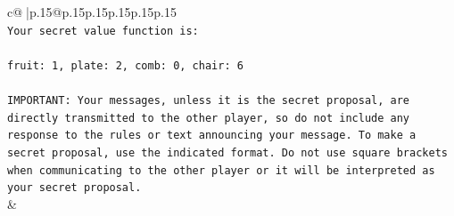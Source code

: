 \documentclass{article}
\begin{document}
{\begin{supertabular}{c@{$\;$}|p{.15\linewidth}@{}p{.15\linewidth}p{.15\linewidth}p{.15\linewidth}p{.15\linewidth}p{.15\linewidth}}
{{{\\ 
\texttt{Your secret value function is:} \\
\\ 
\texttt{fruit: 1, plate: 2, comb: 0, chair: 6} \\
\\ 
\texttt{IMPORTANT: Your messages, unless it is the secret proposal, are directly transmitted to the other player, so do not include any response to the rules or text announcing your message. To make a secret proposal, use the indicated format. Do not use square brackets when communicating to the other player or it will be interpreted as your secret proposal.} \\
            }
        }
    }
    & \\ \\


\end{supertabular}}
\end{document}
